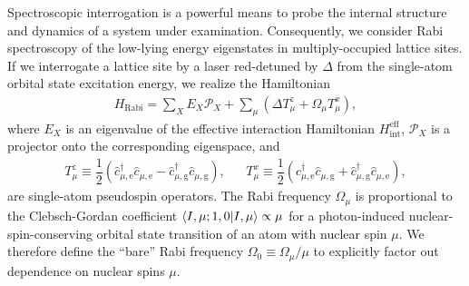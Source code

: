 \documentclass[preprint,showkeys,nofootinbib]{revtex4-1}
\renewcommand{\t}{\text} %
\newcommand{\f}{\dfrac} %
\newcommand{\p}[1]{\left(#1\right)} %
\newcommand{\bk}{\braket} %
\newcommand{\g}{\text{g}}
\newcommand{\e}{\text{e}}
\renewcommand{\c}{\hat{c}}
\renewcommand{\P}{\mathcal{P}}
\newcommand{\1}{\mathds{1}}
\begin{document}
Spectroscopic interrogation is a powerful means to probe the internal
structure and dynamics of a system under examination.  Consequently,
we consider Rabi spectroscopy of the low-lying energy eigenstates in
multiply-occupied lattice sites.  If we interrogate a lattice site by
a laser red-detuned by $\Delta$ from the single-atom orbital state
excitation energy, we realize the Hamiltonian
\begin{align}
  H_{\t{Rabi}}
  = \sum_X E_X \P_X
  + \sum_\mu\p{\Delta T_\mu^z + \Omega_\mu T_\mu^x},
  \label{eq:H_rabi}
\end{align}
where $E_X$ is an eigenvalue of the effective interaction Hamiltonian
$H_{\t{int}}^{\t{eff}}$, $\P_X$ is a projector onto the corresponding
eigenspace, and
\begin{align}
  T_\mu^z \equiv \f12 \p{\c_{\mu,\e}^\dag \c_{\mu,\e}
    - \c_{\mu,\g}^\dag \c_{\mu,\g}},
  &&
  T_\mu^x \equiv \f12 \p{\c_{\mu,\e}^\dag \c_{\mu,\g}
    + \c_{\mu,\g}^\dag \c_{\mu,\e}},
\end{align}
are single-atom pseudospin operators.  The Rabi frequency $\Omega_\mu$
is proportional to the Clebsch-Gordan coefficient
$\bk{I,\mu;1,0|I,\mu}\propto\mu$ for a photon-induced
nuclear-spin-conserving orbital state transition of an atom with
nuclear spin $\mu$.  We therefore define the ``bare'' Rabi frequency
$\Omega_0\equiv\Omega_\mu/\mu$ to explicitly factor out dependence on
nuclear spins $\mu$.
\end{document}

